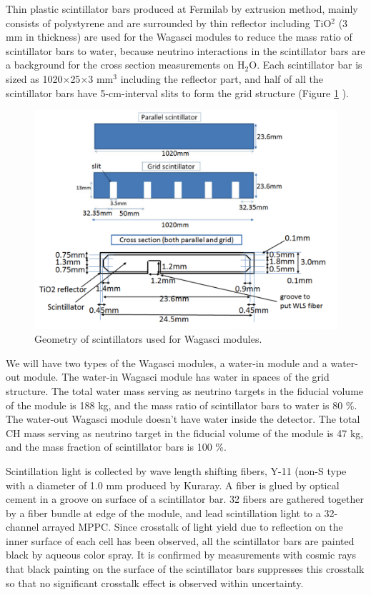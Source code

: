 Thin plastic scintillator bars produced at Fermilab by extrusion method, mainly consists of polystyrene and are surrounded by thin reflector including TiO$^{2}$ (3 mm in thickness) are used for the Wagasci modules to reduce the mass ratio of scintillator bars to water,
because neutrino interactions in the scintillator bars are a background for the cross section measurements on H$_{2}$O.
Each scintillator bar is sized as 1020$\times$25$\times$3 mm$^{3}$ including the reflector part, and 
half of all the scintillator bars have 5-cm-interval slits to form the grid structure (Figure \ref{fig:wagasci_scinti_geometry} ). 

\begin{figure}[tbh]
\begin{center}
\includegraphics[width=0.8\linewidth]{fig/wagasci_scinti_geometry.pdf}
\end{center}
\caption{
Geometry of scintillators used for Wagasci modules.
}
\label{fig:wagasci_scinti_geometry}
\end{figure}


We will have two types of the Wagasci modules, a water-in module and a water-out module.
The water-in Wagasci module has water in spaces of the grid structure.
The total water mass serving as neutrino targets in the fiducial volume of the module is 188 kg,
and the mass ratio of scintillator bars to water is 80 \%.
The water-out Wagasci module doesn't have water inside the detector.
The total CH mass serving as neutrino target in the fiducial volume of the module is 47 kg,
and the mass fraction of scintillator bars is 100 \%.


Scintillation light is collected by wave length shifting fibers, Y-11 (non-S type  with a diameter of 1.0 mm produced by Kuraray. 
A fiber is glued by optical cement in a groove on surface of a scintillator bar. 
32 fibers are gathered together by a fiber bundle at edge of the module, and lead scintillation light to a 32-channel arrayed MPPC.
Since crosstalk of light yield due to reflection on the inner surface of each cell has been observed, all the scintillator bars are painted black by aqueous color spray.
It is confirmed by measurements with cosmic rays that black painting on the surface of the scintillator bars suppresses this crosstalk so that no significant crosstalk effect is observed within uncertainty.



